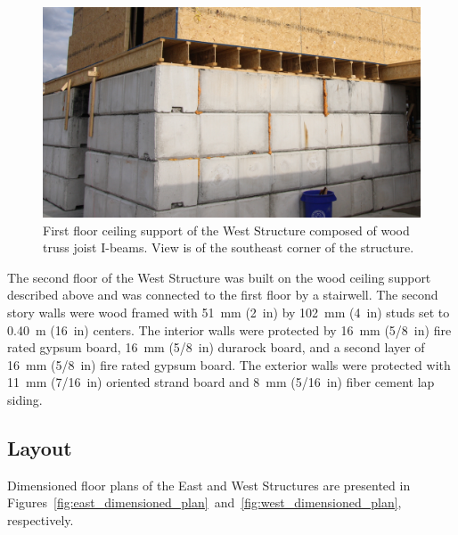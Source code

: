 \documentclass[12pt,oneside]{book}
\begin{document}
\begin{figure}[!ht]
	\includegraphics[width=6in]{../../Hose_Stream_Report/Figures/Pictures/TJI_support}
	\caption[TJI-constructed ceiling support of the West Structure.]{First floor ceiling support of the West Structure composed of wood truss joist I-beams. View is of the southeast corner of the structure.}
	\label{fig:TJI}
\end{figure}
\FloatBarrier

The second floor of the West Structure was built on the wood ceiling support described above and was connected to the first floor by a stairwell. The second story walls were wood framed with 51~mm (2~in) by 102~mm (4~in) studs set to 0.40~m (16~in) centers. The interior walls were protected by 16~mm (5/8~in) fire rated gypsum board, 16~mm (5/8~in) durarock board, and a second layer of 16~mm (5/8~in) fire rated gypsum board. The exterior walls were protected with 11~mm (7/16~in) oriented strand board and 8~mm (5/16~in) fiber cement lap siding.

\subsection{Layout}
\label{sec:layout}
Dimensioned floor plans of the East and West Structures are presented in Figures~\ref{fig:east_dimensioned_plan}~and~\ref{fig:west_dimensioned_plan}, respectively.
\end{document}
